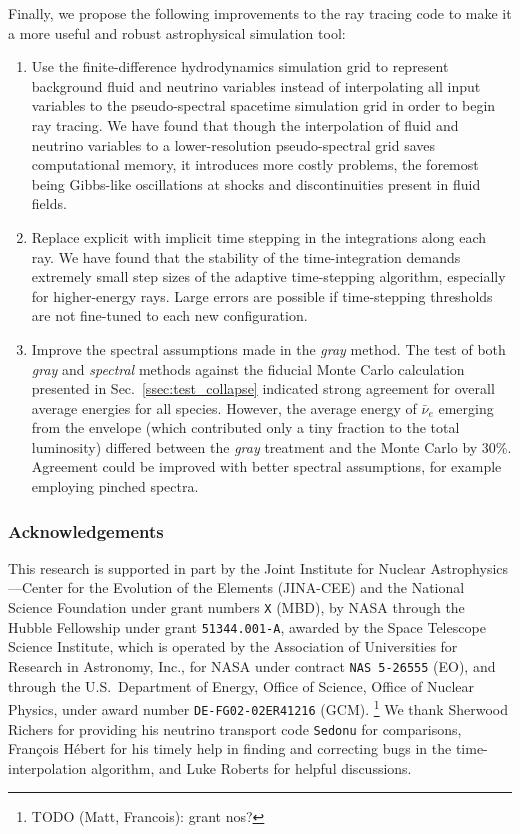 \documentclass[aps,floatfix,prd,superscriptaddress,twocolumn]{revtex4-1}
\begin{document}
Finally, we propose the following improvements to the ray tracing code to make
it a more useful and robust astrophysical simulation tool:
\begin{enumerate}
\item Use the finite-difference hydrodynamics simulation grid to represent
  background fluid and neutrino variables instead of interpolating all
  input variables to the pseudo-spectral spacetime simulation grid in order
  to begin ray tracing.
  We have found that though the interpolation of fluid and neutrino variables
  to a lower-resolution pseudo-spectral grid saves computational memory, it
  introduces more costly problems, the foremost being Gibbs-like oscillations
  at shocks and discontinuities present in fluid fields.
\item Replace explicit with implicit time stepping in the integrations along
  each ray. We have found that the stability of the time-integration demands
  extremely small step sizes of the adaptive time-stepping algorithm, especially
  for higher-energy rays. Large errors are possible if time-stepping thresholds
  are not fine-tuned to each new configuration.
\item Improve the spectral assumptions made in the \emph{gray} method.
  The test of both \emph{gray} and \emph{spectral} methods against
  the fiducial Monte Carlo calculation presented in Sec.~\ref{ssec:test_collapse}
  indicated strong agreement for overall average energies for all species. 
  However, the average energy of $\bar{\nu}_e$ emerging from the envelope
  (which contributed only a tiny fraction to the total luminosity)
  differed between the \emph{gray} treatment and the Monte Carlo by 30\%.
  Agreement could be improved with better spectral assumptions, for example
  employing pinched spectra.
\end{enumerate}

\subsubsection*{Acknowledgements}
This research is supported in part by the Joint Institute for Nuclear
Astrophysics---Center for the Evolution of the Elements (JINA-CEE)
and the National Science Foundation under grant numbers \lstinline{X} (MBD),
by NASA through the Hubble Fellowship under grant \lstinline{51344.001-A},
awarded by the Space Telescope Science Institute,
which is operated  by the Association of Universities for Research in Astronomy, Inc.,
for NASA under contract \lstinline{NAS 5-26555} (EO),
and through the U.S.\ Department of Energy, Office of Science, Office of Nuclear Physics,
under award number \lstinline{DE-FG02-02ER41216} (GCM).
\footnote{TODO (Matt, Francois): grant nos?}
We thank Sherwood Richers for providing his neutrino transport code
\lstinline{Sedonu} for comparisons,
Fran\c{c}ois H\'{e}bert for his timely help in finding and
correcting bugs in the time-interpolation algorithm,
and Luke Roberts for helpful discussions.
\end{document}
